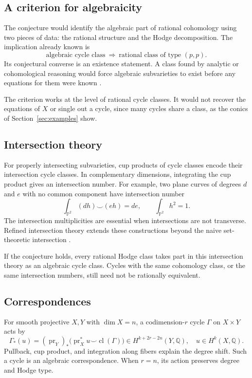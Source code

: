 \documentclass[11pt,reqno]{amsart}
\theoremstyle{definition}
\theoremstyle{remark}
\numberwithin{equation}{section}
\newcommand{\Q}{\mathbb{Q}}
\newcommand{\PP}{\mathbb{P}}
\DeclareMathOperator{\cl}{cl}
\begin{document}
\subsection{A criterion for algebraicity}

The conjecture would identify the algebraic part of rational cohomology
using two pieces of data: the rational structure and the Hodge
decomposition. The implication already known is
\[
 \text{algebraic cycle class}\ \Longrightarrow\
 \text{rational class of type }(p,p).
\]
Its conjectural converse is an existence statement. A class found by
analytic or cohomological reasoning would force algebraic subvarieties to
exist before any equations for them were known \cite{cmihodge}.

The criterion works at the level of rational cycle classes. It would not
recover the equations of $X$ or single out a cycle, since many cycles share
a class, as the conics of Section~\ref{sec:examples} show.

\subsection{Intersection theory}

For properly intersecting subvarieties, cup products of cycle classes
encode their intersection cycle classes. In complementary dimensions,
integrating the cup product gives an intersection number. For example,
two plane curves of degrees $d$ and $e$ with no common component have
intersection number
\[
 \int_{\PP^2}(dh)\smile(eh)=de,
 \qquad \int_{\PP^2}h^2=1.
\]
The intersection multiplicities are essential when intersections are
not transverse. Refined intersection theory extends these constructions
beyond the naive set-theoretic intersection \cite{fulton1998}.

If the conjecture holds, every rational Hodge class takes part in this
intersection theory as an algebraic cycle class. Cycles with the same
cohomology class, or the same intersection numbers, still need not be
rationally equivalent.

\subsection{Correspondences}

For smooth projective $X,Y$ with $\dim X=n$, a codimension-$r$ cycle
$\Gamma$ on $X\times Y$ acts by
\begin{equation}\label{eq:correspondence}
 \Gamma_*(u)=(\operatorname{pr}_Y)_*
 \bigl(\operatorname{pr}_X^*u\smile\cl(\Gamma)\bigr)
 \in H^{k+2r-2n}(Y,\Q),\quad u\in H^k(X,\Q).
\end{equation}
Pullback, cup product, and integration along fibers explain the degree
shift. Such a cycle is an algebraic correspondence. When $r=n$, its
action preserves degree and Hodge type.
\end{document}
